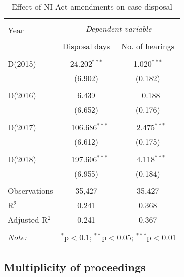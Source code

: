 \begin{table}[!ht]
  \centering
  \caption{Effect of NI Act amendments on case
    disposal}\label{tab:amendments_effect}
  \footnotesize
  \begin{tabular}{@{\extracolsep{5pt}}lcc}
    \\[-1.8ex] 
    \hline \\[-1.8ex] 
    \multirow{2}{*}{Year} & \multicolumn{2}{c}{\textit{Dependent variable}} \\ 
    \cline{2-3} 
    \\[-1.8ex] & Disposal days & No. of hearings \\ 
    \hline \\[-1.8ex] 
    D(2015) & 24.202$^{***}$ & 1.020$^{***}$ \\ 
    & (6.902) & (0.182) \\ 
    & & \\ 
    D(2016) & 6.439 & $-$0.188 \\ 
    & (6.652) & (0.176) \\ 
    & & \\ 
    D(2017) & $-$106.686$^{***}$ & $-$2.475$^{***}$ \\ 
    & (6.612) & (0.175) \\ 
    & & \\ 
    D(2018) & $-$197.606$^{***}$ & $-$4.118$^{***}$ \\ 
    & (6.955) & (0.184) \\
    \hline \\[-1.8ex] 
    Observations & 35,427 & 35,427 \\ 
    R$^{2}$ & 0.241 & 0.368 \\ 
    Adjusted R$^{2}$ & 0.241 & 0.367 \\ 
    \hline \\[-1.8ex] 
    \textit{Note:}  & \multicolumn{2}{r}{$^{*}$p$<$0.1; $^{**}$p$<$0.05; $^{***}$p$<$0.01} \\ 
  \end{tabular} 
\end{table}


\subsection{Multiplicity of proceedings}
\label{sec:mult-proc}

